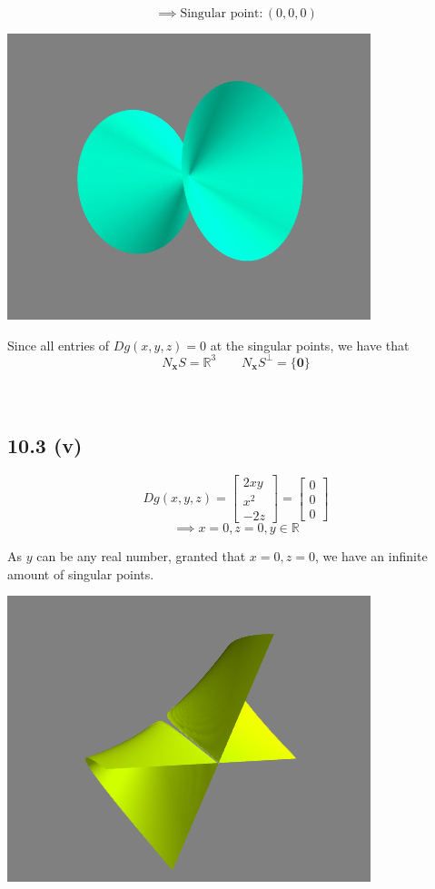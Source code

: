 \documentclass[letterpaper,12pt]{article}
\theoremstyle{definition}
\begin{document}
\[ \implies \text{Singular point}: (0,0,0)\]

\includegraphics[scale = .75]{3iv}

Since all entries of $Dg(x,y,z) = 0$ at the singular points, we have that \[N_{\mathbf{x}}S = \mathbb{R}^3 \qquad N_{\mathbf{x}}S^{\perp} = \{\mathbf{0}\}\]
\\\\

\subsection*{10.3 (v)}

\[ Dg(x,y,z) = \begin{bmatrix}
2xy \\
x^2 \\
-2z 
\end{bmatrix}
= \begin{bmatrix}
0 \\
0 \\
0 
\end{bmatrix} \]
\[ \implies x = 0, z = 0, y \in \mathbb{R} \]


As $y$ can be any real number, granted that $x=0, z=0$, we have an infinite amount of singular points.

\includegraphics[scale = .75]{3v}
\end{document}
